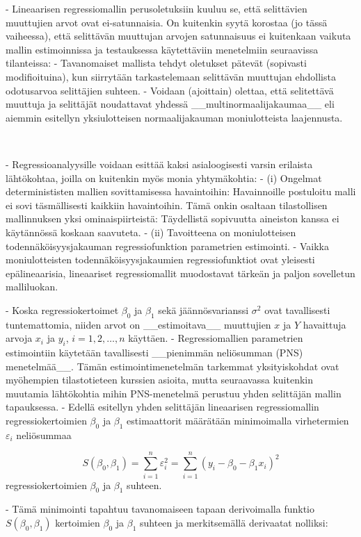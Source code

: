 \documentclass[
]{book}
\begin{document}
\begin{itemize}
- Lineaarisen regressiomallin perusoletuksiin kuuluu se, että selittävien muuttujien arvot ovat ei-satunnaisia. On kuitenkin syytä korostaa (jo tässä vaiheessa), että selittävän muuttujan arvojen satunnaisuus ei kuitenkaan vaikuta mallin estimoinnissa ja testauksessa käytettäviin menetelmiin seuraavissa tilanteissa:
  - Tavanomaiset mallista tehdyt oletukset pätevät (sopivasti modifioituina), kun siirrytään tarkastelemaan selittävän muuttujan ehdollista odotusarvoa selittäjien suhteen.
  - Voidaan (ajoittain) olettaa, että selitettävä muuttuja ja selittäjät noudattavat yhdessä __multinormaalijakaumaa__ eli aiemmin esitellyn yksiulotteisen normaalijakauman moniulotteista laajennusta.

\
\

- Regressioanalyysille voidaan esittää kaksi asialoogisesti varsin erilaista lähtökohtaa, joilla on kuitenkin myös monia yhtymäkohtia:
  - (i) Ongelmat determinististen mallien sovittamisessa havaintoihin: Havainnoille postuloitu malli ei sovi täsmällisesti kaikkiin havaintoihin. Tämä onkin osaltaan tilastollisen mallinnuksen yksi ominaispiirteistä: Täydellistä sopivuutta aineiston kanssa ei käytännössä koskaan saavuteta.
  - (ii) Tavoitteena on moniulotteisen todennäköisyysjakauman regressiofunktion parametrien estimointi.
    - Vaikka moniulotteisten todennäköisyysjakaumien regressiofunktiot ovat yleisesti epälineaarisia, lineaariset regressiomallit muodostavat tärkeän ja paljon sovelletun malliluokan.

- Koska regressiokertoimet $\beta_0$ ja $\beta_1$ sekä jäännösvarianssi $\sigma^2$ ovat tavallisesti tuntemattomia, niiden arvot on __estimoitava__ muuttujien $x$ ja $Y$ havaittuja arvoja $x_i$ ja $y_i$, $i=1,2, \ldots, n$ käyttäen.
    - Regressiomallien parametrien estimointiin käytetään tavallisesti __pienimmän neliösumman (PNS) menetelmää__. Tämän estimointimenetelmän tarkemmat yksityiskohdat ovat myöhempien tilastotieteen kurssien asioita, mutta seuraavassa kuitenkin muutamia lähtökohtia mihin PNS-menetelmä perustuu yhden selittäjän mallin tapauksessa.
    - Edellä esitellyn yhden selittäjän lineaarisen regressiomallin regressiokertoimien $\beta_0$ ja $\beta_1$ estimaattorit määrätään minimoimalla virhetermien $\varepsilon_i$ neliösummaa

$$
S(\beta_0,\beta_1) = \sum_{i=1}^{n} \varepsilon^2_i = \sum_{i=1}^{n} (y_i - \beta_0 - \beta_1 x_i)^2 
$$
regressiokertoimien $\beta_0$ ja $\beta_1$ suhteen.

- Tämä minimointi tapahtuu tavanomaiseen tapaan derivoimalla funktio $S(\beta_0,\beta_1)$ kertoimien $\beta_0$ ja $\beta_1$ suhteen ja merkitsemällä derivaatat nolliksi:


\end{itemize}
\end{document}

